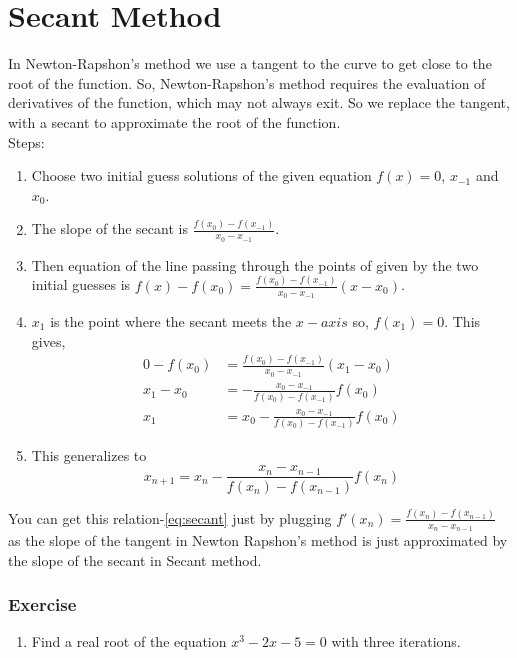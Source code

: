 \documentclass[aima203_lecturenotes_ku.tex]{subfiles}
\begin{document}
\section{Secant Method}
In Newton-Rapshon's method we use a tangent to the curve to get close to the root of the function. So, Newton-Rapshon's method requires the evaluation of derivatives of the function, which may not always exit. So we replace the tangent, with a secant to approximate the root of the function. \\[2mm]
Steps:
\begin{enumerate}
\item Choose two initial guess solutions of the given equation \(f(x)=0\), \(x_{-1}\) and \(x_0\).

\item The slope of the secant is \(\displaystyle \frac{f(x_0)-f(x_{-1})}{x_0 - x_{-1}}\).

\item  Then equation of the line passing through the points of given by the two initial guesses is \(\displaystyle f(x)-f(x_0)= \frac{f(x_0)-f(x_{-1})}{x_0 - x_{-1}} (x - x_0) \).

\item $x_1$ is the point where the secant meets the $x-axis$ so, $f(x_1)=0$. This gives,
  \begin{align*}
    0-f(x_0) &= \frac{f(x_0)-f(x_{-1})}{x_0 - x_{-1}} (x_1 - x_0) \\
    x_1 -x_0 &= - \frac{x_0 - x_{-1}}{f(x_0)-f(x_{-1})} f(x_0) \\
    x_1 &= x_0 - \frac{x_0 - x_{-1}}{f(x_0)-f(x_{-1})} f(x_0)
  \end{align*}

\item This generalizes to
  \begin{equation}
    \label{eq:secant}
    x_{n+1} = x_n - \frac{x_n - x_{n-1}}{f(x_n)-f(x_{n-1})} f(x_n)
  \end{equation}
\end{enumerate}
You can get this relation-\ref{eq:secant} just by plugging $f'(x_n)=\frac{f(x_n)-f(x_{n-1})}{x_n - x_{n-1}}$ as the slope of the tangent in Newton Rapshon's method is just approximated by the slope of the secant in Secant method.

\subsubsection{Exercise}
\begin{enumerate}
\item Find a real root of the equation $x^3-2x-5=0$ with three iterations.
\end{enumerate}
\end{document}
